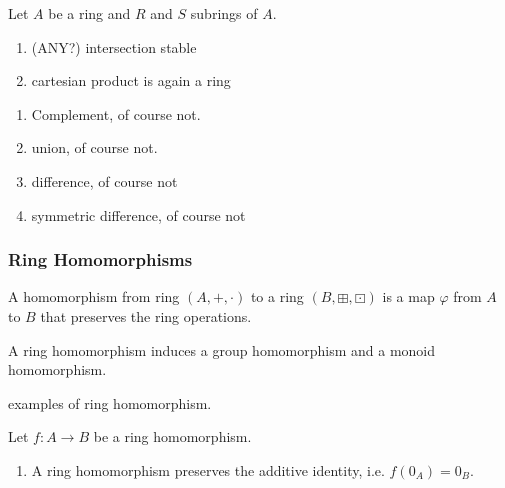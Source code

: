 %
%
%
\begin{thmbox}
    \begin{proposition}
        Let \(A\) be a ring and \(R\) and \(S\) subrings of \(A\).
        \begin{enumerate}
            \item (ANY?) intersection stable
            \item cartesian product is again a ring
        \end{enumerate}
    \end{proposition}
\end{thmbox}
%
%
%
\begin{exmbox}
    \begin{example}
        \begin{enumerate}
            \item Complement, of course not.
            \item union, of course not.
            \item difference, of course not
            \item symmetric difference, of course not
        \end{enumerate}
    \end{example}
\end{exmbox}

\subsubsection*{Ring Homomorphisms}
\begin{defbox}
    \begin{definition}
        A homomorphism from ring \((A, +, \cdot)\) to a ring \((B, \boxplus, \boxdot)\) is a map \(\varphi\) from \(A\) to \(B\) that preserves the ring operations.
    \end{definition}
\end{defbox}
%
%
%
\begin{rembox}
    \begin{remark}
        A ring homomorphism induces a group homomorphism and a monoid homomorphism.
    \end{remark}
\end{rembox}
%
%
%
\begin{example}
    examples of ring homomorphism.
\end{example}
%
%
%
\begin{thmbox}
    \begin{proposition}
        Let \(f: A \rightarrow B\) be a ring homomorphism.
        \begin{enumerate}
            \item A ring homomorphism preserves the additive identity, i.e. \(f(0_A) = 0_B\).
        \end{enumerate}
    \end{proposition}
\end{thmbox}
